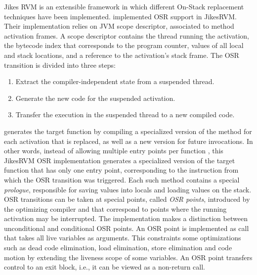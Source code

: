 Jikes RVM is an extensible framework in which different On-Stack replacement techniques have been implemented.
 implemented OSR support in JikesRVM. 
Their implementation relies on JVM scope descriptor, associated to method activation frames.
A scope descriptor contains the thread running the activation, the bytecode index that corresponds to the program counter, values of all local and stack locations, and a reference to the activation's stack frame.
The OSR transition is divided into three steps: 
\begin{enumerate}
    \item Extract the compiler-independent state from a suspended thread. 
    \item Generate the new code for the suspended activation.
    \item Transfer the execution in the suspended thread to a new compiled code.
\end{enumerate}
 generates the target function by compiling a specialized version of the method for each activation that is replaced, as well as a new version for future invocations.
In other words, instead of allowing multiple entry points per function \cite{lameed2013modular, paleczny2001java}, this JikesRVM OSR implementation generates a specialized version of the target function that has only one entry point, corresponding to the instruction from which the OSR transition was triggered.
Each such method contains a special \textit{prologue}, responsible for saving values into locals and loading values on the stack.
OSR transitions can be taken at special points, called \textit{OSR points}, introduced by the optimizing compiler and that correspond to points where the running activation may be interrupted.
The implementation makes a distinction between unconditional and conditional OSR points.
An OSR point is implemented as call that takes all live variables as arguments. 
This constraints some optimizations such as dead code elimination, load elimination, store elimination and code motion by extending the liveness scope of some variables.
An OSR point transfers control to an exit block, i.e., it can be viewed as a non-return call.\\

